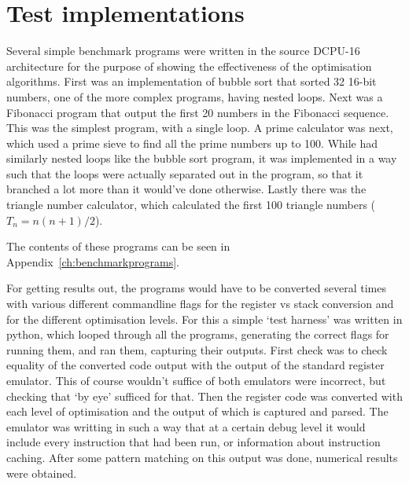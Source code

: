 \section{Test implementations}
Several simple benchmark programs were written in the source DCPU-16
architecture for the purpose of showing the effectiveness of the optimisation
algorithms. First was an implementation of bubble sort that sorted 32 16-bit
numbers, one of the more complex programs, having nested loops. Next was a
Fibonacci program that output the first 20 numbers in the Fibonacci sequence.
This was the simplest program, with a single loop. A prime calculator was next,
which used a prime sieve to find all the prime numbers up to 100. While had
similarly nested loops like the bubble sort program, it was implemented in a way
such that the loops were actually separated out in the program, so that it
branched a lot more than it would've done otherwise. Lastly there was the
triangle number calculator, which calculated the first 100 triangle numbers
($T_{n} = n(n+1)/2$).

The contents of these programs can be seen in
Appendix~\ref{ch:benchmarkprograms}.

For getting results out, the programs would have to be converted several times
with various different commandline flags for the register vs stack conversion
and for the different optimisation levels. For this a simple `test harness' was
written in python, which looped through all the programs, generating the correct
flags for running them, and ran them, capturing their outputs. First check was
to check equality of the converted code output with the output of the standard
register emulator. This of course wouldn't suffice of both emulators were
incorrect, but checking that `by eye' sufficed for that. Then the register code
was converted with each level of optimisation and the output of which is
captured and parsed. The emulator was writting in such a way that at a certain
debug level it would include every instruction that had been run, or information
about instruction caching. After some pattern matching on this output was done,
numerical results were obtained.

